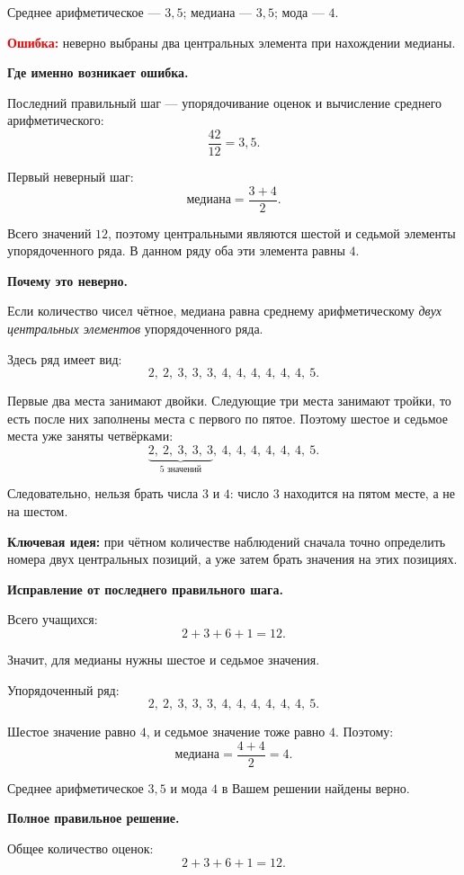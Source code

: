 \documentclass[12pt,a4paper]{article}
\begin{document}
Среднее арифметическое --- $3{,}5$; медиана --- $3{,}5$; мода --- $4$.

\textcolor{red}{\textbf{Ошибка:}} неверно выбраны два центральных элемента при нахождении медианы.

\textbf{Где именно возникает ошибка.}

Последний правильный шаг --- упорядочивание оценок и вычисление среднего арифметического:
\[
\frac{42}{12}=3{,}5.
\]

Первый неверный шаг:
\[
\text{медиана}=\frac{3+4}{2}.
\]

Всего значений $12$, поэтому центральными являются шестой и седьмой элементы упорядоченного ряда. В данном ряду оба эти элемента равны $4$.

\textbf{Почему это неверно.}

Если количество чисел чётное, медиана равна среднему арифметическому \emph{двух центральных элементов} упорядоченного ряда.

Здесь ряд имеет вид:
\[
2,\ 2,\ 3,\ 3,\ 3,\ 4,\ 4,\ 4,\ 4,\ 4,\ 4,\ 5.
\]

Первые два места занимают двойки. Следующие три места занимают тройки, то есть после них заполнены места с первого по пятое. Поэтому шестое и седьмое места уже заняты четвёрками:
\[
\underbrace{2,\ 2,\ 3,\ 3,\ 3}_{5\text{ значений}},
\ \boxed{4},\ \boxed{4},
\ 4,\ 4,\ 4,\ 4,\ 5.
\]

Следовательно, нельзя брать числа $3$ и $4$: число $3$ находится на пятом месте, а не на шестом.

\textcolor{blue!60!black}{\textbf{Ключевая идея:}} при чётном количестве наблюдений сначала точно определить номера двух центральных позиций, а уже затем брать значения на этих позициях.

\textbf{Исправление от последнего правильного шага.}

Всего учащихся:
\[
2+3+6+1=12.
\]

Значит, для медианы нужны шестое и седьмое значения.

Упорядоченный ряд:
\[
2,\ 2,\ 3,\ 3,\ 3,\ 4,\ 4,\ 4,\ 4,\ 4,\ 4,\ 5.
\]

Шестое значение равно $4$, и седьмое значение тоже равно $4$. Поэтому:
\[
\text{медиана}=\frac{4+4}{2}=4.
\]

Среднее арифметическое $3{,}5$ и мода $4$ в Вашем решении найдены верно.

\textbf{Полное правильное решение.}

Общее количество оценок:
\[
2+3+6+1=12.
\]
\end{document}
